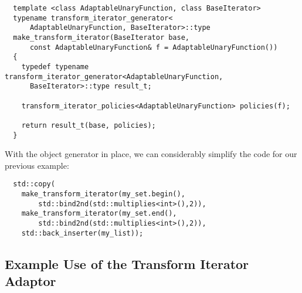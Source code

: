 \documentclass{netobjectdays}
\newcommand{\iteratoradaptor}{\code{iterator\_\-adaptor}}
\begin{document}
{\footnotesize
\begin{verbatim}
  template <class AdaptableUnaryFunction, class BaseIterator>
  typename transform_iterator_generator<
      AdaptableUnaryFunction, BaseIterator>::type
  make_transform_iterator(BaseIterator base,
      const AdaptableUnaryFunction& f = AdaptableUnaryFunction())
  {
    typedef typename transform_iterator_generator<AdaptableUnaryFunction,
      BaseIterator>::type result_t;

    transform_iterator_policies<AdaptableUnaryFunction> policies(f);

    return result_t(base, policies);
  }
\end{verbatim}
}

With the object generator in place, we can considerably simplify the
code for our previous example:

{\footnotesize
\begin{verbatim}
  std::copy(
    make_transform_iterator(my_set.begin(), 
        std::bind2nd(std::multiplies<int>(),2)),
    make_transform_iterator(my_set.end(), 
        std::bind2nd(std::multiplies<int>(),2)),
    std::back_inserter(my_list));
\end{verbatim}
}


%
%




\subsection{Example Use of the Transform Iterator Adaptor}
\end{document}
